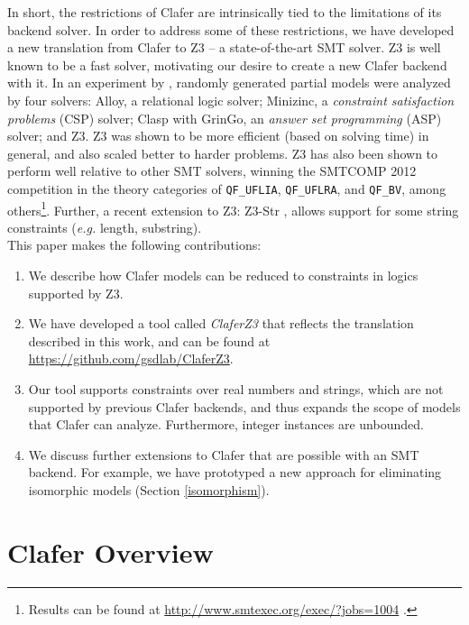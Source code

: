 \documentclass{easychair}
\newcommand{\eg}{\emph{e.g.}\xspace}
\begin{document}
\indent In short, the restrictions of Clafer are intrinsically tied to the limitations of its backend solver. In order to address some of these restrictions, we have developed a new translation from Clafer to Z3 \cite{Moura} -- a state-of-the-art SMT solver. Z3 is well known to be a fast solver, motivating our desire to create a new Clafer backend with it. In an experiment by \cite{Saadatpanah2012}, randomly generated partial models were analyzed by four solvers: Alloy, a relational logic solver; Minizinc, a  \textit{constraint satisfaction problems} (CSP) solver; Clasp with GrinGo, an \textit{answer set programming} (ASP) solver; and Z3. Z3 was shown to be more efficient (based on solving time) in general, and also scaled better to harder problems. Z3 has also been shown to perform well relative to other SMT solvers, winning the SMTCOMP 2012 competition in the theory categories of \texttt{QF\_UFLIA}, \texttt{QF\_UFLRA}, and \texttt{QF\_BV}, among others\footnote{Results can be found at \url{http://www.smtexec.org/exec/?jobs=1004} .}. Further, a recent extension to Z3: Z3-Str \cite{Zheng2013}, allows support for some string constraints (\eg length, substring).\\
\indent This paper makes the following contributions:
\begin{enumerate}
\item We describe how Clafer models can be reduced to constraints in logics supported by Z3. 
\item We have developed a tool called \textit{ClaferZ3} that reflects the translation described in this work, and can be found at \url{https://github.com/gsdlab/ClaferZ3}.
\item Our tool supports constraints over real numbers and strings, which are not supported by previous Clafer backends, and thus expands the scope of models that Clafer can analyze. Furthermore, integer instances are unbounded.
\item We discuss further extensions to Clafer that are possible with an SMT backend. For example, we have prototyped a new approach for eliminating isomorphic models (Section \ref{isomorphism}).
\end{enumerate}

\section{Clafer Overview}
\label{claferoverview}
\end{document}
